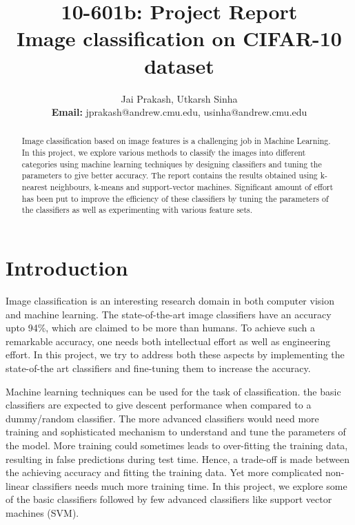 \documentclass{article} %
\author{Jai Prakash, Utkarsh Sinha \\ \textbf{Email:} jprakash@andrew.cmu.edu, usinha@andrew.cmu.edu}
\title{10-601b: Project Report\\Image classification on CIFAR-10 dataset
}
\begin{document}
\maketitle

\begin{abstract}
Image classification based on image features is a challenging job in Machine Learning. In this project, we explore various methods to classify the images into different categories using machine learning techniques by designing classifiers and tuning the parameters to give better accuracy. The report contains the results obtained using k-nearest neighbours, k-means and support-vector machines. Significant amount of effort has been put to improve the efficiency of these classifiers by tuning the parameters of the classifiers as well as experimenting with various feature sets. %
\end{abstract}

\section{Introduction}
Image classification is an interesting research domain in both computer vision and machine learning. The state-of-the-art image classifiers have an accuracy upto 94\%, which are claimed to be more than humans. To achieve such a remarkable accuracy, one needs both intellectual effort as well as engineering effort. In this project, we try to address both these aspects by implementing the state-of-the art classifiers and fine-tuning them to increase the accuracy.

Machine learning techniques can be used for the task of classification. the basic classifiers are expected to give descent performance when compared to a dummy/random classifier. The more advanced classifiers would need more training and sophisticated mechanism to understand and tune the parameters of the model. More training could sometimes leads to over-fitting the training data, resulting in false predictions during test time. Hence, a trade-off is made between the achieving accuracy and fitting the training data. Yet more complicated non-linear classifiers needs much more training time. In this project, we explore some of the basic classifiers followed by few advanced classifiers like support vector machines (SVM).
\end{document}
